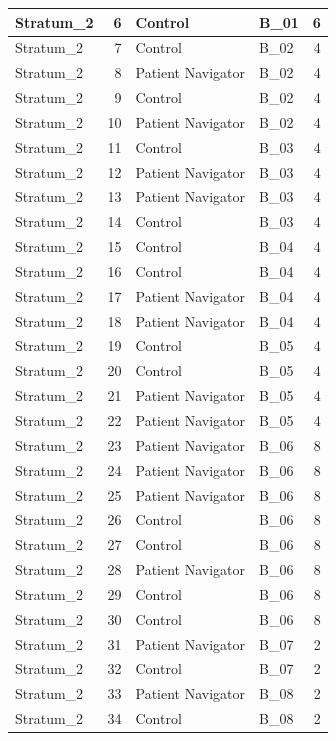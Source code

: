 \documentclass[
]{book}
\begin{document}
\begin{table}[H]
\begin{tabular}{l|r|l|l|r}
\hline
Stratum\_2 & 6 & Control & B\_01 & 6\\
\hline
Stratum\_2 & 7 & Control & B\_02 & 4\\
\hline
Stratum\_2 & 8 & Patient Navigator & B\_02 & 4\\
\hline
Stratum\_2 & 9 & Control & B\_02 & 4\\
\hline
Stratum\_2 & 10 & Patient Navigator & B\_02 & 4\\
\hline
Stratum\_2 & 11 & Control & B\_03 & 4\\
\hline
Stratum\_2 & 12 & Patient Navigator & B\_03 & 4\\
\hline
Stratum\_2 & 13 & Patient Navigator & B\_03 & 4\\
\hline
Stratum\_2 & 14 & Control & B\_03 & 4\\
\hline
Stratum\_2 & 15 & Control & B\_04 & 4\\
\hline
Stratum\_2 & 16 & Control & B\_04 & 4\\
\hline
Stratum\_2 & 17 & Patient Navigator & B\_04 & 4\\
\hline
Stratum\_2 & 18 & Patient Navigator & B\_04 & 4\\
\hline
Stratum\_2 & 19 & Control & B\_05 & 4\\
\hline
Stratum\_2 & 20 & Control & B\_05 & 4\\
\hline
Stratum\_2 & 21 & Patient Navigator & B\_05 & 4\\
\hline
Stratum\_2 & 22 & Patient Navigator & B\_05 & 4\\
\hline
Stratum\_2 & 23 & Patient Navigator & B\_06 & 8\\
\hline
Stratum\_2 & 24 & Patient Navigator & B\_06 & 8\\
\hline
Stratum\_2 & 25 & Patient Navigator & B\_06 & 8\\
\hline
Stratum\_2 & 26 & Control & B\_06 & 8\\
\hline
Stratum\_2 & 27 & Control & B\_06 & 8\\
\hline
Stratum\_2 & 28 & Patient Navigator & B\_06 & 8\\
\hline
Stratum\_2 & 29 & Control & B\_06 & 8\\
\hline
Stratum\_2 & 30 & Control & B\_06 & 8\\
\hline
Stratum\_2 & 31 & Patient Navigator & B\_07 & 2\\
\hline
Stratum\_2 & 32 & Control & B\_07 & 2\\
\hline
Stratum\_2 & 33 & Patient Navigator & B\_08 & 2\\
\hline
Stratum\_2 & 34 & Control & B\_08 & 2\\

\end{tabular}
\end{table}
\end{document}
